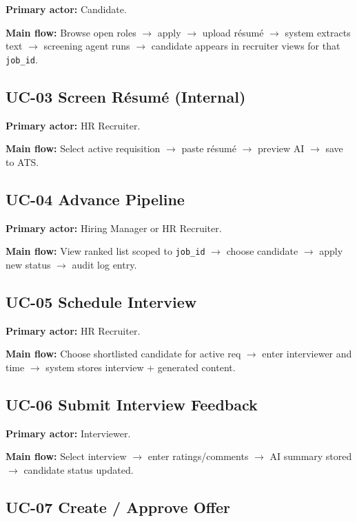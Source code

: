 \documentclass[12pt]{article}
\begin{document}
\textbf{Primary actor:} Candidate.

\textbf{Main flow:} Browse open roles $\rightarrow$ apply $\rightarrow$ upload résumé $\rightarrow$ system extracts text $\rightarrow$ screening agent runs $\rightarrow$ candidate appears in recruiter views for that \texttt{job\_id}.

\subsection{UC-03 Screen Résumé (Internal)}

\textbf{Primary actor:} HR Recruiter.

\textbf{Main flow:} Select active requisition $\rightarrow$ paste résumé $\rightarrow$ preview AI $\rightarrow$ save to ATS.

\subsection{UC-04 Advance Pipeline}

\textbf{Primary actor:} Hiring Manager or HR Recruiter.

\textbf{Main flow:} View ranked list scoped to \texttt{job\_id} $\rightarrow$ choose candidate $\rightarrow$ apply new status $\rightarrow$ audit log entry.

\subsection{UC-05 Schedule Interview}

\textbf{Primary actor:} HR Recruiter.

\textbf{Main flow:} Choose shortlisted candidate for active req $\rightarrow$ enter interviewer and time $\rightarrow$ system stores interview + generated content.

\subsection{UC-06 Submit Interview Feedback}

\textbf{Primary actor:} Interviewer.

\textbf{Main flow:} Select interview $\rightarrow$ enter ratings/comments $\rightarrow$ AI summary stored $\rightarrow$ candidate status updated.

\subsection{UC-07 Create / Approve Offer}
\end{document}
